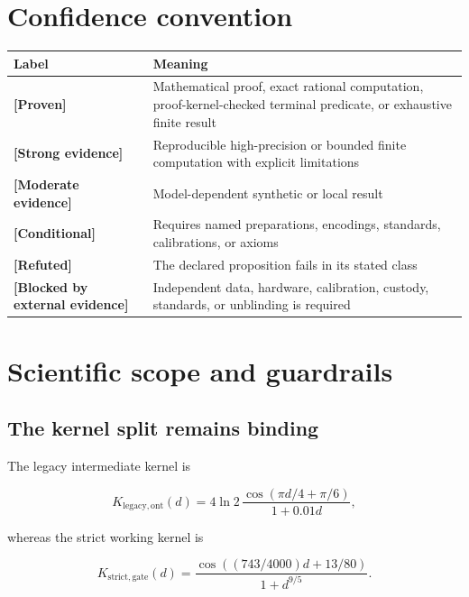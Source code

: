 \documentclass[11pt,a4paper,openany]{report}
\newcommand{\statusProven}{\textcolor{fingreen}{[Proven]}}
\newcommand{\statusStrong}{\textcolor{finblue}{[Strong evidence]}}
\newcommand{\statusModerate}{\textcolor{finviolet}{[Moderate evidence]}}
\newcommand{\statusRefuted}{\textcolor{finred}{[Refuted]}}
\begin{document}
\tableofcontents
\clearpage
{}

\chapter*{Confidence convention}

\begin{center}
\begingroup\small
\setlength{\tabcolsep}{2.5pt}
\renewcommand{\arraystretch}{1.16}
\begin{longtable}{@{}p{}p{}@{}}
\toprule
\textbf{Label} & \textbf{Meaning} \\
\midrule
\endhead
\textbf{\statusProven{}} & Mathematical proof, exact rational computation, proof-kernel-checked terminal predicate, or exhaustive finite result \\
\textbf{\statusStrong{}} & Reproducible high-precision or bounded finite computation with explicit limitations \\
\textbf{\statusModerate{}} & Model-dependent synthetic or local result \\
\textbf{[Conditional]} & Requires named preparations, encodings, standards, calibrations, or axioms \\
\textbf{\statusRefuted{}} & The declared proposition fails in its stated class \\
\textbf{[Blocked by external evidence]} & Independent data, hardware, calibration, custody, standards, or unblinding is required \\
\bottomrule
\end{longtable}
\endgroup
\end{center}

\chapter{Scientific scope and guardrails}

\section{The kernel split remains binding}

The legacy intermediate kernel is

\[
K_{\mathrm{legacy,ont}}(d)
=
4\ln2\,
\frac{\cos(\pi d/4+\pi/6)}{1+0.01d},
\]

whereas the strict working kernel is

\[
K_{\mathrm{strict,gate}}(d)
=
\frac{\cos((743/4000)d+13/80)}
{1+d^{9/5}}.
\]
\end{document}
